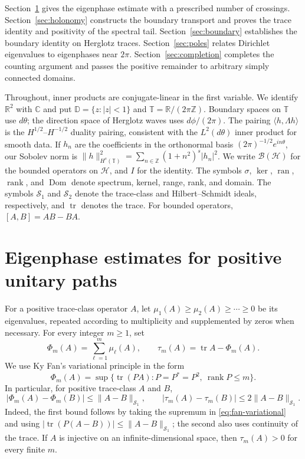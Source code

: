 \documentclass[11pt]{amsart}
\numberwithin{equation}{section}
\newcommand{\D}{\mathbb D}
\newcommand{\T}{\mathbb T}
\newcommand{\Hh}{\mathcal H}
\newcommand{\Id}{I}
\newcommand{\tr}{\operatorname{tr}}
\newcommand{\Dom}{\operatorname{Dom}}
\newcommand{\ran}{\operatorname{ran}}
\newcommand{\rank}{\operatorname{rank}}
\newcommand{\ip}[2]{\langle #1,#2\rangle}
\newcommand{\norm}[1]{\lVert #1\rVert}
\begin{document}
Section~\ref{sec:phase} gives the eigenphase estimate with a prescribed
number of crossings. Section~\ref{sec:holonomy} constructs the boundary
transport and proves the trace identity and positivity of the spectral
tail. Section~\ref{sec:boundary} establishes the boundary identity on
Herglotz traces. Section~\ref{sec:poles} relates Dirichlet eigenvalues
to eigenphases near $2\pi$. Section~\ref{sec:completion} completes the
counting argument and passes the positive remainder to arbitrary
simply connected domains.

Throughout, inner products are conjugate-linear in the first variable.
We identify $\mathbb R^2$ with $\mathbb C$ and put
$\D=\{z:|z|<1\}$ and $\T=\mathbb R/(2\pi\mathbb Z)$.
Boundary spaces on $\T$ use $d\theta$; the direction space of
Herglotz waves uses $d\phi/(2\pi)$. The pairing
$\ip h{\Lambda h}$ is the $H^{1/2}$--$H^{-1/2}$ duality pairing,
consistent with the $L^2(d\theta)$ inner product for smooth data.
If $h_n$ are the coefficients in the orthonormal basis
$(2\pi)^{-1/2}e^{in\theta}$, our Sobolev norm is
$\norm h_{H^s(\T)}^2=\sum_{n\in\mathbb Z}(1+n^2)^s|h_n|^2$.
We write $\mathcal B(\Hh)$ for the bounded operators on $\Hh$,
and $\Id$ for the identity. The symbols $\sigma$, $\ker$, $\ran$,
$\rank$, and $\Dom$ denote spectrum, kernel, range, rank, and domain.
The symbols $\mathcal S_1$ and $\mathcal S_2$ denote the trace-class
and Hilbert--Schmidt ideals, respectively, and $\tr$ denotes the trace.
For bounded operators, $[A,B]=AB-BA$.

\section{Eigenphase estimates for positive unitary paths}\label{sec:phase}

For a positive trace-class operator $A$, let
$\mu_1(A)\ge\mu_2(A)\ge\cdots\ge0$ be its eigenvalues, repeated
according to multiplicity and supplemented by zeros when necessary.
For every integer $m\ge1$, set
\begin{equation}\label{eq:fan-def}
 \Phi_m(A)=\sum_{\ell=1}^m\mu_\ell(A),\qquad
 \tau_m(A)=\tr A-\Phi_m(A).
\end{equation}
We use Ky Fan's variational principle \cite{Fan} in the form
\begin{equation}\label{eq:fan-variational}
 \Phi_m(A)=\sup\{\tr(PA):P=P^*=P^2,\ \rank P\le m\}.
\end{equation}
In particular, for positive trace-class $A$ and $B$,
\begin{equation}\label{eq:fan-continuity}
 |\Phi_m(A)-\Phi_m(B)|\le\norm{A-B}_{\mathcal S_1},\qquad
 |\tau_m(A)-\tau_m(B)|\le2\norm{A-B}_{\mathcal S_1}.
\end{equation}
Indeed, the first bound follows by taking the supremum in
\eqref{eq:fan-variational} and using
$|\tr(P(A-B))|\le\norm{A-B}_{\mathcal S_1}$; the second also uses
continuity of the trace. If $A$ is injective on an infinite-dimensional
space, then $\tau_m(A)>0$ for every finite $m$.
\end{document}
